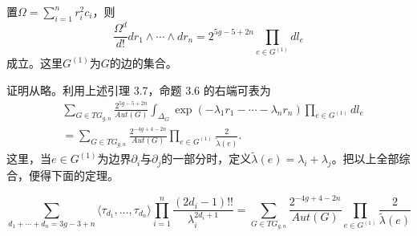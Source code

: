 \begin{lemma}[Kontsevich {[K]}，定理 C.1]
置$\Omega=\sum_{i=1}^nr_i^2c_i$，则
\[
\frac{\Omega^d}{d!}dr_1\wedge\cdots\wedge dr_n=2^{5g-5+2n}\prod_{e\in G^{(1)}}dl_e
\]
成立。这里$G^{(1)}$为$G$的边的集合。
\end{lemma}

证明从略。利用上述引理 3.7，命题 3.6 的右端可表为
\[
\begin{aligned}
&\sum_{G\in TG_{g,n}}\frac{2^{5g-5+2n}}{Aut(G)}
\int_{\Delta_G}\exp(-\lambda_1r_1-\cdots-\lambda_nr_n)\prod_{e\in G^{(1)}}dl_e\\
&=\sum_{G\in TG_{g,n}}\frac{2^{-4g+4-2n}}{Aut(G)}\prod_{e\in G^{(1)}}\frac{2}{\tilde\lambda(e)}.
\end{aligned}
\]
这里，当$e\in G^{(1)}$为边界$\partial_i$与$\partial_j$的一部分时，定义$\tilde\lambda(e)=\lambda_i+\lambda_j$。把以上全部综合，便得下面的定理。

\begin{theorem}
\[
\sum_{d_1+\cdots+d_n=3g-3+n}\langle\tau_{d_1},\dots,\tau_{d_n}\rangle
\prod_{i=1}^n\frac{(2d_i-1)!!}{\lambda_i^{2d_i+1}}
=\sum_{G\in TG_{g,n}}\frac{2^{-4g+4-2n}}{Aut(G)}\prod_{e\in G^{(1)}}\frac{2}{\tilde\lambda(e)}
\]
\end{theorem}
